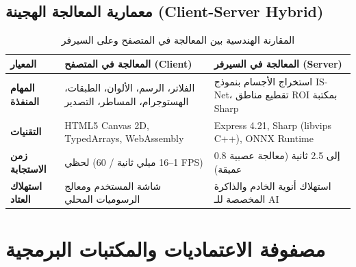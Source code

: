\documentclass[12pt,a4paper]{report}
\begin{document}
\section{معمارية المعالجة الهجينة (Client-Server Hybrid)}
\begin{table}[htbp]
    \centering
    \caption{المقارنة الهندسية بين المعالجة في المتصفح وعلى السيرفر}
    \label{tab:processing-comparison}
    \begin{tabularx}{\textwidth}{p{3.5cm} X X}
        \toprule
        \textbf{المعيار} & \textbf{المعالجة في المتصفح (Client)} & \textbf{المعالجة في السيرفر (Server)} \\
        \midrule
        \textbf{المهام المنفذة} & الفلاتر، الرسم، الألوان، الطبقات، الهستوجرام، المساطر، التصدير & استخراج الأجسام بنموذج IS-Net، تقطيع مناطق ROI بمكتبة Sharp \\
        \textbf{التقنيات} & HTML5 Canvas 2D, TypedArrays, WebAssembly & Express 4.21, Sharp (libvips C++), ONNX Runtime \\
        \textbf{زمن الاستجابة} & لحظي (1--16 ميلي ثانية / 60 FPS) & 0.8 إلى 2.5 ثانية (معالجة عصبية عميقة) \\
        \textbf{استهلاك العتاد} & شاشة المستخدم ومعالج الرسوميات المحلي & استهلاك أنوية الخادم والذاكرة المخصصة للـ AI \\
        \bottomrule
    \end{tabularx}
\end{table}

\chapter{مصفوفة الاعتماديات والمكتبات البرمجية}
\end{document}
